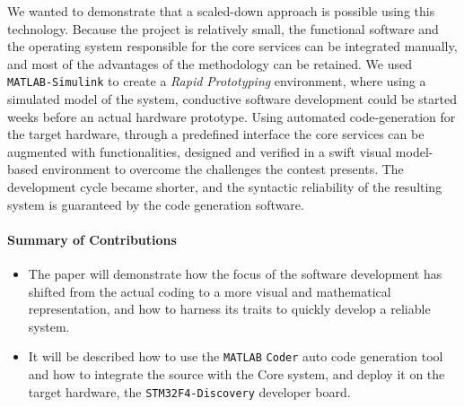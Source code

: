 
We wanted to demonstrate that a scaled-down approach is possible using this technology. Because the project is relatively small, the functional software and the operating system responsible for the core services can be integrated manually, and most of the advantages of the methodology can be retained. We used \verb!MATLAB-Simulink! to create a \emph{Rapid Prototyping} environment, where using a simulated model of the system, conductive software development could be started weeks before an actual hardware prototype. Using automated code-generation for the target hardware, through a predefined interface the core services can be augmented with functionalities, designed and verified in a swift visual model-based environment to overcome the challenges the contest presents. The development cycle became shorter, and the syntactic reliability of the resulting system is guaranteed by the code generation software.

\paragraph{Summary of Contributions}
\begin{itemize}
\item The paper will demonstrate how the focus of the software development has shifted from the actual coding to a more visual and mathematical representation, and how to harness its traits to quickly develop a reliable system.
\item It will be described how to use the \verb!MATLAB! \verb!Coder! auto code generation tool and how to integrate the source with the Core system, and deploy it on the target hardware, the \verb!STM32F4-Discovery! developer board.
\end{itemize}